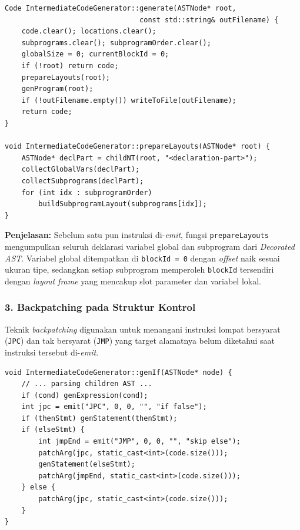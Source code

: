 \documentclass[12pt, a4paper]{article}
\begin{document}
\begin{lstlisting}[caption={Entry point dan memory layouting pada IntermediateCodeGenerator}]
Code IntermediateCodeGenerator::generate(ASTNode* root,
                                const std::string& outFilename) {
    code.clear(); locations.clear();
    subprograms.clear(); subprogramOrder.clear();
    globalSize = 0; currentBlockId = 0;
    if (!root) return code;
    prepareLayouts(root);
    genProgram(root);
    if (!outFilename.empty()) writeToFile(outFilename);
    return code;
}

void IntermediateCodeGenerator::prepareLayouts(ASTNode* root) {
    ASTNode* declPart = childNT(root, "<declaration-part>");
    collectGlobalVars(declPart);
    collectSubprograms(declPart);
    for (int idx : subprogramOrder)
        buildSubprogramLayout(subprograms[idx]);
}
\end{lstlisting}

\textbf{Penjelasan:} Sebelum satu pun instruksi di-\textit{emit}, fungsi \texttt{prepareLayouts} mengumpulkan seluruh deklarasi variabel global dan subprogram dari \textit{Decorated AST}. Variabel global ditempatkan di \texttt{blockId = 0} dengan \textit{offset} naik sesuai ukuran tipe, sedangkan setiap subprogram memperoleh \texttt{blockId} tersendiri dengan \textit{layout frame} yang mencakup slot parameter dan variabel lokal.

\vspace{0.5cm}

\subsubsection*{3. Backpatching pada Struktur Kontrol}
Teknik \textit{backpatching} digunakan untuk menangani instruksi lompat bersyarat (\texttt{JPC}) dan tak bersyarat (\texttt{JMP}) yang target alamatnya belum diketahui saat instruksi tersebut di-\textit{emit}.

\begin{lstlisting}[caption={Backpatching pada genIf untuk konstruksi IF-THEN-ELSE}]
void IntermediateCodeGenerator::genIf(ASTNode* node) {
    // ... parsing children AST ...
    if (cond) genExpression(cond);
    int jpc = emit("JPC", 0, 0, "", "if false");
    if (thenStmt) genStatement(thenStmt);
    if (elseStmt) {
        int jmpEnd = emit("JMP", 0, 0, "", "skip else");
        patchArg(jpc, static_cast<int>(code.size()));
        genStatement(elseStmt);
        patchArg(jmpEnd, static_cast<int>(code.size()));
    } else {
        patchArg(jpc, static_cast<int>(code.size()));
    }
}
\end{lstlisting}
\end{document}
